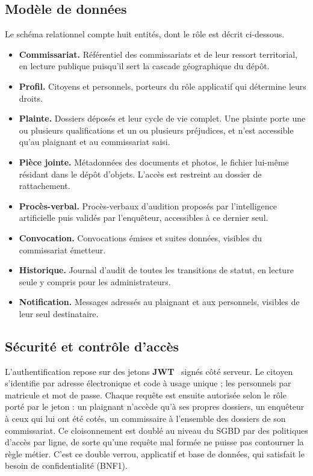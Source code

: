 \subsection{Modèle de données}

Le schéma relationnel compte huit entités, dont le rôle est décrit ci-dessous.

\begin{itemize}
    \item \textbf{Commissariat.} Référentiel des commissariats et de leur ressort territorial, en lecture publique puisqu'il sert la cascade géographique du dépôt.
    \item \textbf{Profil.} Citoyens et personnels, porteurs du rôle applicatif qui détermine leurs droits.
    \item \textbf{Plainte.} Dossiers déposés et leur cycle de vie complet. Une plainte porte une ou plusieurs qualifications et un ou plusieurs préjudices, et n'est accessible qu'au plaignant et au commissariat saisi.
    \item \textbf{Pièce jointe.} Métadonnées des documents et photos, le fichier lui-même résidant dans le dépôt d'objets. L'accès est restreint au dossier de rattachement.
    \item \textbf{Procès-verbal.} Procès-verbaux d'audition proposés par l'intelligence artificielle puis validés par l'enquêteur, accessibles à ce dernier seul.
    \item \textbf{Convocation.} Convocations émises et suites données, visibles du commissariat émetteur.
    \item \textbf{Historique.} Journal d'audit de toutes les transitions de statut, en lecture seule y compris pour les administrateurs.
    \item \textbf{Notification.} Messages adressés au plaignant et aux personnels, visibles de leur seul destinataire.
\end{itemize}

\subsection{Sécurité et contrôle d'accès}

L'authentification repose sur des jetons \textbf{JWT}~\cite{jwt-rfc} signés côté serveur. Le citoyen s'identifie par adresse électronique et code à usage unique ; les personnels par matricule et mot de passe. Chaque requête est ensuite autorisée selon le rôle porté par le jeton : un plaignant n'accède qu'à ses propres dossiers, un enquêteur à ceux qui lui ont été cotés, un commissaire à l'ensemble des dossiers de son commissariat. Ce cloisonnement est doublé au niveau du SGBD par des politiques d'accès par ligne, de sorte qu'une requête mal formée ne puisse pas contourner la règle métier. C'est ce double verrou, applicatif et base de données, qui satisfait le besoin de confidentialité (BNF1).

